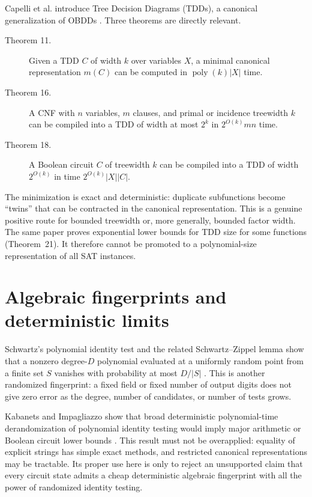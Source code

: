 \documentclass[11pt]{article}
\newcommand{\poly}{\operatorname{poly}}
\begin{document}
Capelli et al. introduce Tree Decision Diagrams (TDDs), a canonical
generalization of OBDDs \cite{capelli2026}.  Three theorems are directly
relevant.

\begin{description}
\item[Theorem 11.] Given a TDD $C$ of width $k$ over variables $X$, a
minimal canonical representation $m(C)$ can be computed in
$\poly(k)|X|$ time.

\item[Theorem 16.] A CNF with $n$ variables, $m$ clauses, and primal or
incidence treewidth $k$ can be compiled into a TDD of width at most $2^k$ in
$2^{O(k)}mn$ time.

\item[Theorem 18.] A Boolean circuit $C$ of treewidth $k$ can be compiled
into a TDD of width $2^{O(k)}$ in time
$2^{O(k)}|X||C|$.
\end{description}

The minimization is exact and deterministic: duplicate subfunctions become
``twins'' that can be contracted in the canonical representation.  This is a
genuine positive route for bounded treewidth or, more generally, bounded
factor width.  The same paper proves exponential lower bounds for TDD size
for some functions (Theorem~21).  It therefore cannot be promoted to a
polynomial-size representation of all SAT instances.

\section{Algebraic fingerprints and deterministic limits}

Schwartz's polynomial identity test and the related Schwartz--Zippel lemma
show that a nonzero degree-$D$ polynomial evaluated at a uniformly random
point from a finite set $S$ vanishes with probability at most $D/|S|$
\cite{schwartz1980}.  This is another randomized fingerprint: a fixed field
or fixed number of output digits does not give zero error as the degree,
number of candidates, or number of tests grows.

Kabanets and Impagliazzo show that broad deterministic polynomial-time
derandomization of polynomial identity testing would imply major arithmetic
or Boolean circuit lower bounds \cite{kabanetsimpagliazzo2004}.  This result
must not be overapplied: equality of explicit strings has simple exact
methods, and restricted canonical representations may be tractable.  Its
proper use here is only to reject an unsupported claim that every circuit
state admits a cheap deterministic algebraic fingerprint with all the power
of randomized identity testing.
\end{document}
